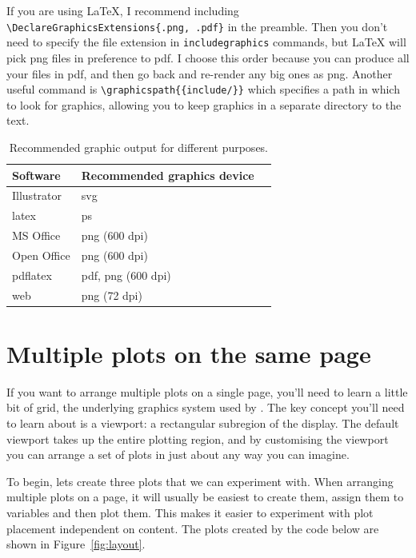 If you are using \LaTeX, I recommend including \verb|\DeclareGraphicsExtensions{.png, .pdf}| in the preamble.  Then you don't need to specify the file extension in \verb|includegraphics| commands, but \LaTeX{} will pick png files in preference to pdf.  I choose this order because you can produce all your files in pdf, and then go back and re-render any big ones as png.  Another useful command is \verb|\graphicspath{{include/}}| which specifies a path in which to look for graphics, allowing you to keep graphics in a separate directory to the text.

\begin{table}
  \begin{center}
  \begin{tabular}{lll}
    \toprule
    Software & Recommended graphics device \\
    \midrule
    Illustrator & svg \\
    latex & ps \\
    MS Office & png (600 dpi) \\
    Open Office & png (600 dpi) \\
    pdflatex & pdf, png (600 dpi) \\
    web & png (72 dpi) \\
    \bottomrule 
  \end{tabular}
  \end{center}
  \caption{Recommended graphic output for different purposes.}
  \label{tbl:graphic-recommendation}
\end{table}

\section{Multiple plots on the same page}
\label{sec:grid-layout}

If you want to arrange multiple plots on a single page, you'll need to learn a little bit of grid, the underlying graphics system used by \ggplot. The key concept you'll need to learn about is a viewport: a rectangular subregion of the display. The default viewport takes up the entire plotting region, and by customising the viewport you can arrange a set of plots in just about any way you can imagine.

To begin, lets create three plots that we can experiment with. When arranging multiple plots on a page, it will usually be easiest to create them, assign them to variables and then plot them. This makes it easier to experiment with plot placement independent on content. The plots created by the code below are shown in Figure~\ref{fig:layout}.

